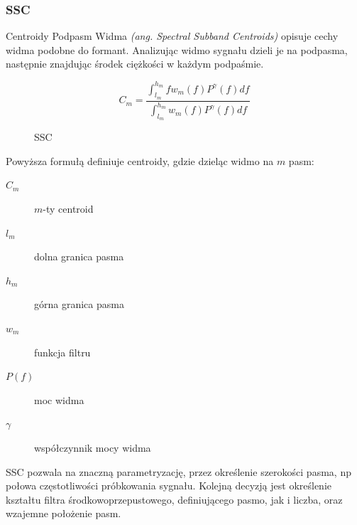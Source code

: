 \documentclass[a4paper,12pt,twoside,openany]{report}
\newcommand{\ang}[1]{\textit{(ang. #1)}}
\begin{document}
\subsubsection{SSC}
Centroidy Podpasm Widma \ang{Spectral Subband Centroids} opisuje cechy widma podobne do formant.
Analizując widmo sygnału dzieli je na podpasma, następnie znajdując środek ciężkości w każdym podpaśmie.
\begin{figure}[h]
	\begin{equation}
		C_m=\frac
		{\int_{l_m}^{h_m} f w_m(f) P^\gamma(f)df}
		{\int_{l_m}^{h_m} w_m(f) P^\gamma(f)df}
		\label{eq:ssc}
	\end{equation}
	\caption{SSC}
\end{figure}
Powyższa formułą definiuje centroidy, gdzie dzieląc widmo na $m$ pasm:
\begin{description}
	\item[$C_m$] $m$-ty centroid
	\item[$l_m$] dolna granica pasma
	\item[$h_m$] górna granica pasma
	\item[$w_m$] funkcja filtru
	\item[$P(f)$] moc widma
	\item[$\gamma$] współczynnik mocy widma
\end{description}
SSC pozwala na znaczną parametryzację, przez określenie szerokości pasma, np połowa częstotliwości próbkowania sygnału.\cite{Majstorovic2011}
Kolejną decyzją jest określenie kształtu filtra środkowoprzepustowego, definiującego pasmo, 
jak i liczba, oraz wzajemne położenie pasm.
\end{document}
